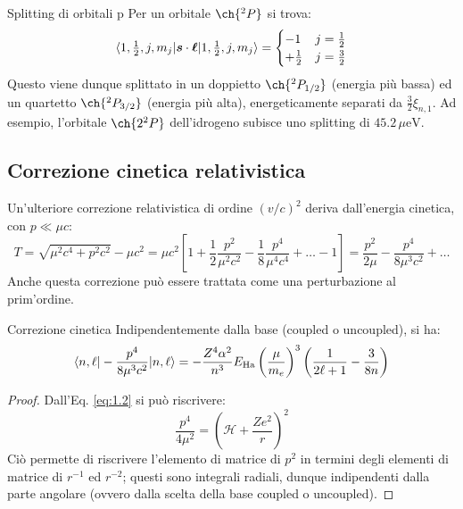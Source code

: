 \begin{example}{Splitting di orbitali p}{}
	Per un orbitale $ \ch{^2 P} $ si trova:
	\begin{equation*}
		\braket{1, \tfrac{1}{2}, j, m_j | \boldsymbol{s} \cdot \boldsymbol{\ell} | 1, \tfrac{1}{2}, j, m_j} =
		\begin{cases}
			-1 & j = \frac{1}{2} \\
			+ \frac{1}{2} & j = \frac{3}{2}
		\end{cases}
	\end{equation*}
	Questo viene dunque splittato in un doppietto $ \ch{^2P_{1/2}} $ (energia più bassa) ed un quartetto $ \ch{^2P_{3/2}} $ (energia più alta), energeticamente separati da $ \frac{3}{2} \xi_{n,1} $. Ad esempio, l'orbitale $ \ch{2^2P} $ dell'idrogeno subisce uno splitting di $ 45.2 \,\mu\text{eV} $.
\end{example}

\subsection{Correzione cinetica relativistica}

Un'ulteriore correzione relativistica di ordine $ (v/c)^2 $ deriva dall'energia cinetica, con $ p \ll \mu c $:
\begin{equation*}
	T = \sqrt{\mu^2 c^4 + p^2 c^2} - \mu c^2 = \mu c^2 \left[ 1 + \frac{1}{2} \frac{p^2}{\mu^2 c^2} - \frac{1}{8} \frac{p^4}{\mu^4 c^4} + \dots - 1 \right] = \frac{p^2}{2\mu} - \frac{p^4}{8 \mu^3 c^2} + \dots
\end{equation*}
Anche questa correzione può essere trattata come una perturbazione al prim'ordine.

\begin{proposition}{Correzione cinetica}{}
	Indipendentemente dalla base (coupled o uncoupled), si ha:
	\begin{equation}
		\braket{n,\ell | - \frac{p^4}{8 \mu^3 c^2} | n,\ell} = - \frac{Z^4 \alpha^2}{n^3} E_\text{Ha} \left( \frac{\mu}{m_e} \right)^3 \left( \frac{1}{2\ell + 1} - \frac{3}{8n} \right)
		\label{eq:1.18}
	\end{equation}

	\tcblower

	\begin{proof}
		Dall'Eq. \ref{eq:1.2} si può riscrivere:
		\begin{equation*}
			\frac{p^4}{4\mu^2} = \left( \mathcal{H} + \frac{Ze^2}{r} \right)^2
		\end{equation*}
		Ciò permette di riscrivere l'elemento di matrice di $ p^2 $ in termini degli elementi di matrice di $ r^{-1} $ ed $ r^{-2} $; questi sono integrali radiali, dunque indipendenti dalla parte angolare (ovvero dalla scelta della base coupled o uncoupled).
	\end{proof}
\end{proposition}

